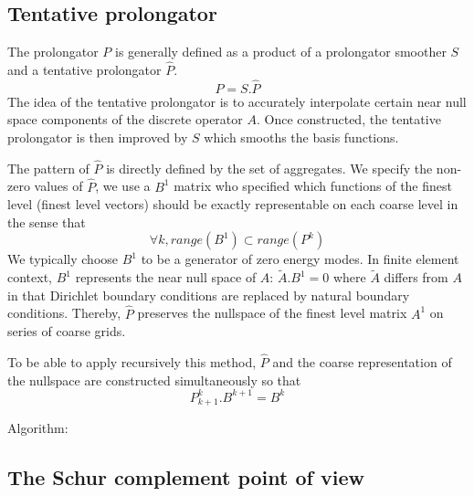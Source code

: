 \subsection{Tentative prolongator}
\newcommand{\Ptent}{\hat{P}}

The prolongator $P$ is generally defined as a product of a prolongator
smoother $S$ and a tentative prolongator $\Ptent$.
$$P=S.\Ptent$$ 
The idea of the tentative prolongator is to
accurately interpolate certain near null space components of
the discrete operator $A$. Once constructed, the tentative prolongator
is then improved by $S$ which smooths the basis functions.

The pattern of $\Ptent$ is directly defined by the set of aggregates.
We specify the non-zero values of $\Ptent$, we use a $B^1$ matrix who
specified which functions of the finest level (finest level vectors)
should be exactly representable on each coarse level in the sense that
$$\forall k, range(B^1) \subset range(P^k)$$
%
We typically choose $B^1$ to be a generator of zero energy modes. In
finite element context, $B^1$ represents the near null space of $A$:
$\tilde{A}.B^1=0$ where $\tilde{A}$ differs from $A$ in that Dirichlet
boundary conditions are replaced by natural boundary conditions.
%
Thereby, $\Ptent$ preserves the nullspace of the finest level matrix
$A^1$ on series of coarse grids.

To be able to apply recursively this method, $\Ptent$ and the coarse representation of the nullspace are constructed simultaneously so that
$$P_{k+1}^k . B^{k+1} = B^{k}$$

Algorithm:






\subsection{The Schur complement point of view}

%
\newcommand{\Aff}{A_{ff}}
\newcommand{\Afc}{A_{fc}}
\newcommand{\Acf}{A_{cf}}
\newcommand{\Acc}{A_{cc}}
\newcommand{\AH} {A_{H }}
\newcommand{\Efc}{E_{fc}}
\newcommand{\Ecf}{E_{cf}}
\newcommand{\inv}{^{-1}}

\newcommand{\vect}[1]{
\begin{pmatrix}
#1_f \\
#1_c \\
\end{pmatrix}\xspace
}
%

